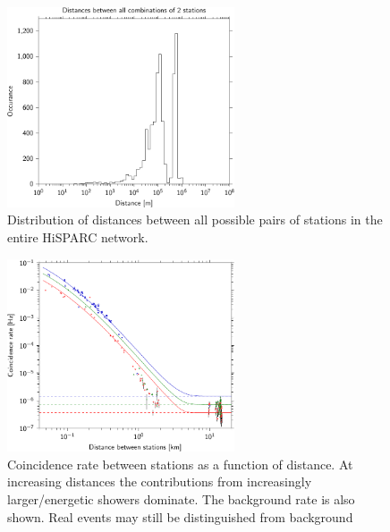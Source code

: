 \begin{figure}
    \centering
    \includegraphics[width=0.6\textwidth]
                    {plots/experiment/network_station_distances}
    \caption{Distribution of distances between all possible pairs of stations in the entire HiSPARC network.}
    \label{fig:network_station_distances}
\end{figure}


\begin{figure}
    \centering
    \includegraphics[width=0.6\textwidth]
                    {plots/experiment/distance_v_coincidence_rate}
    \caption{Coincidence rate between stations as a function of distance. At increasing distances the contributions from increasingly larger/energetic showers dominate. The background rate is also shown. Real events may still be distinguished from background}
    \label{fig:distance_v_coincidence_rate}
\end{figure}


